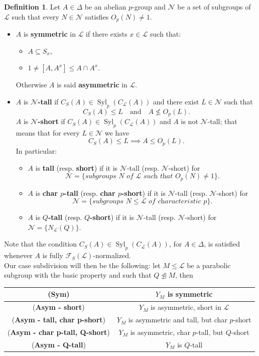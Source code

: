 \documentclass{amsart}
\numberwithin{equation}{section}
\theoremstyle{definition}
\newtheorem{definition}[equation]{Definition}
\theoremstyle{subresult}
\theoremstyle{caseresult}
\newcommand{\F}{\mathcal{F}}
\newcommand{\N}{\mathcal{N}}
\renewcommand{\L}{\mathcal{L}}
\newcommand{\Syl}{\operatorname{Syl}}
\newcommand{\norm}{\trianglelefteq}
\newcommand{\<}{\langle}
\renewcommand{\>}{\rangle}
\begin{document}
\begin{definition} \label{def:symm-tall in a locality}
	Let $A \in \Delta$ be an abelian $p$-group and $\N$ be a set of subgroups of $\L$ such that every $N \in \N$ satisfies $O_p(N) \ne 1$.
	\begin{itemize}
		\item $A$ is {\bf symmetric} in $\L$ if there exists $x \in \L$ such that:
			\begin{itemize}
				\item[(i)] $A \subseteq S_x$,
				\item[(ii)] $1 \ne [A,A^x] \le A \cap A^x$.	
			\end{itemize}
			Otherwise $A$ is said {\bf asymmetric} in $\L$.\\
		\item $A$ is {\bf $\N$-tall} if $C_S(A) \in \Syl_p(C_\L(A))$ and there exist $L \in \N$ such that
		\[
		C_S(A) \le L \quad \text{and} \quad A \not \le O_p(L).
		\]
		$A$ is {\bf $\N$-short} if $C_S(A) \in \Syl_p(C_\L(A))$ and $A$ is not $\N$-tall; that means that for every $L \in \N$ we have
		\[
		C_S(A) \le L \implies A \le O_p(L).
		\]
		In particular:
		\begin{itemize}
			\item $A$ is {\bf tall} (resp. {\bf short}) if it is $\N$-tall (resp. $\N$-short) for 
			\[
			\N= \{ \textit{subgroups $N$ of $\L$ such that $O_p(N) \ne 1$} \}.
			\]
			\item $A$ is {\bf char $p$-tall} (resp. {\bf char $p$-short}) if it is $\N$-tall (resp. $\N$-short) for
			\[
			\N= \{ \textit{subgroups $N \le \L$ of characteristic $p$} \}.
			\]
			\item $A$ is {\bf $Q$-tall} (resp. {\bf $Q$-short}) if it is $\N$-tall (resp. $\N$-short) for $\N= \{ N_\L(Q) \} $.
		\end{itemize}
	\end{itemize}
\end{definition}

Note that the condition $C_S(A) \in \Syl_p(C_\L(A))$, for $A \in \Delta$, is satisfied whenever $A$ is fully $\F_S(\L)$-normalized.\\

Our case subdivision will then be the following: let $M \le \L$ be a parabolic subgroup with the basic property and such that $Q \not \norm M$, then
\begin{center}
\renewcommand{\arraystretch}{1.5}
\begin{tabular}{|c|c|}
    \hline
    (\textbf{Sym}) & $Y_M$ is symmetric \\
    \hline
    (\textbf{Asym - short}) & $Y_M$ is asymmetric, short in $\L$ \\
    \hline 
    (\textbf{Asym - tall, char p-short})  & $Y_M$ is asymmetric and tall, but char $p$-short \\
    \hline
    (\textbf{Asym - char p-tall, Q-short}) & $Y_M$ is asymmetric, char $p$-tall, but $Q$-short \\
    \hline
    (\textbf{Asym - Q-tall}) &  $Y_M$ is $Q$-tall \\
    \hline
\end{tabular}
\end{center}
\end{document}
